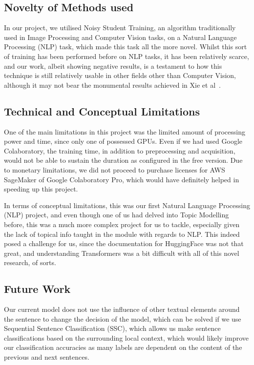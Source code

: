 \documentclass[12pt]{article}
\begin{document}
{\subsection{Novelty of Methods used}

In our project, we utilised Noisy Student Training, an algorithm traditionally used in Image Processing and Computer Vision tasks, on a Natural Language Processing (NLP) task, which made this task all the more novel. Whilst this sort of training has been performed before on NLP tasks, it has been relatively scarce, and our work, albeit showing negative results, is a testament to how this technique is still relatively usable in other fields other than Computer Vision, although it may not bear the monumental results achieved in Xie et al~\cite{noisystudent}.

\subsection{Technical and Conceptual Limitations}

One of the main limitations in this project was the limited amount of processing power and time, since only one of possessed GPUs. Even if we had used Google Colaboratory, the training time, in addition to preprocessing and acquisition, would not be able to sustain the duration as configured in the free version. Due to monetary limitations, we did not proceed to purchase licenses for AWS SageMaker of Google Colaboratory Pro, which would have definitely helped in speeding up this project.

In terms of conceptual limitations, this was our first Natural Language Processing (NLP) project, and even though one of us had delved into Topic Modelling before, this was a much more complex project for us to tackle, especially given the lack of topical info taught in the module with regards to NLP. This indeed posed a challenge for us, since the documentation for HuggingFace was not that great, and understanding Transformers was a bit difficult with all of this novel research, of sorts.

\subsection{Future Work}
Our current model does not use the influence of other textual elements around the sentence to change the decision of the model, which can be solved if we use Sequential Sentence Classification (SSC)\cite{SSC}, which allows us make sentence classifications based on the surrounding local context, which would likely improve our classification accuracies as many labels are dependent on the content of the previous and next sentences.

}
\end{document}
